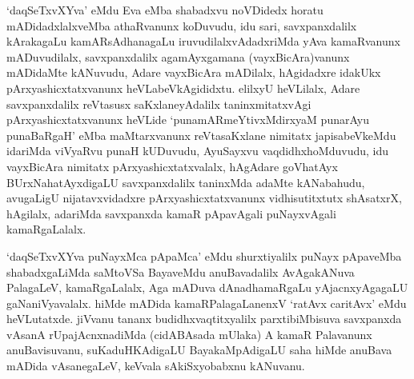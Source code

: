 \begin{artha}
`daqSeTxvXYva' eMdu Eva eMba shabadxvu noVDidedx horatu mADidadxlalxveMba athaRvanunx koDuvudu, idu sari, savxpanxdalilx kArakagaLu kamARsAdhanagaLu iruvudilalxvAdadxriMda yAva kamaRvanunx mADuvudilalx, savxpanxdalilx agamAyxgamana (vayxBicAra)vanunx mADidaMte kANuvudu, Adare vayxBicAra mADilalx, hAgidadxre idakUkx pArxyashicxtatxvanunx heVLabeVkAgididxtu. elilxyU heVLilalx, Adare savxpanxdalilx reVtasusx saKxlaneyAdalilx taninxmitatxvAgi pArxyashicxtatxvanunx heVLide `punamARmeYtivxMdirxyaM punarAyu punaBaRgaH' eMba maMtarxvanunx reVtasaKxlane nimitatx japisabeVkeMdu idariMda viVyaRvu punaH kUDuvudu, AyuSayxvu vaqdidhxhoMduvudu, idu vayxBicAra nimitatx pArxyashicxtatxvalalx, hAgAdare goVhatAyx BUrxNahatAyxdigaLU savxpanxdalilx taninxMda adaMte kANabahudu, avugaLigU nijatavxvidadxre pArxyashicxtatxvanunx vidhisutitxtutx shAsatxrX, hAgilalx, adariMda savxpanxda kamaR pApavAgali puNayxvAgali kamaRgaLalalx. 
\end{artha}

\begin{artha}
`daqSeTxvXYva puNayxMca pApaMca' eMdu shurxtiyalilx puNayx pApaveMba shabadxgaLiMda saMtoVSa BayaveMdu anuBavadalilx AvAgakANuva PalagaLeV, kamaRgaLalalx, Aga mADuva dAnadhamaRgaLu yAjacnxyAgagaLU gaNaniVyavalalx. hiMde mADida kamaRPalagaLanenxV `ratAvx caritAvx' eMdu heVLutatxde. jiVvanu tananx budidhxvaqtitxyalilx parxtibiMbisuva savxpanxda vAsanA rUpajAcnxnadiMda (cidABAsada mUlaka) A kamaR Palavanunx anuBavisuvanu, suKaduHKAdigaLU BayakaMpAdigaLU saha hiMde anuBava mADida vAsanegaLeV, keVvala sAkiSxyobabxnu kANuvanu.
\end{artha}

